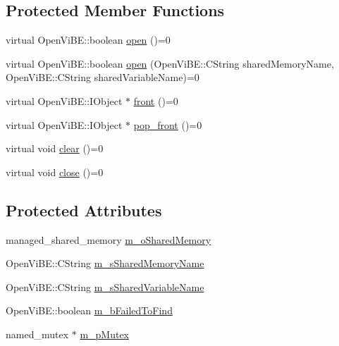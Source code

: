 \subsection*{Protected Member Functions}
\begin{DoxyCompactItemize}
\item 
virtual OpenViBE::boolean \hyperlink{classOpenViBEApplications_1_1ISharedMemoryReader_a5e153bb02320c3ea25beffd4df7b223c}{open} ()=0
\item 
virtual OpenViBE::boolean \hyperlink{classOpenViBEApplications_1_1ISharedMemoryReader_ad53797d01fdd6f79a2727ff6e3d39da2}{open} (OpenViBE::CString sharedMemoryName, OpenViBE::CString sharedVariableName)=0
\item 
virtual OpenViBE::IObject $\ast$ \hyperlink{classOpenViBEApplications_1_1ISharedMemoryReader_aae4da7ee678736f748f0f7e523fefbc7}{front} ()=0
\item 
virtual OpenViBE::IObject $\ast$ \hyperlink{classOpenViBEApplications_1_1ISharedMemoryReader_a558490f2ac7932c90e96ba25798f1800}{pop\_\-front} ()=0
\item 
virtual void \hyperlink{classOpenViBEApplications_1_1ISharedMemoryReader_a14f316c50e394eb81816c0e781284d63}{clear} ()=0
\item 
virtual void \hyperlink{classOpenViBEApplications_1_1ISharedMemoryReader_af453497d26a266316d5f087981212a97}{close} ()=0
\end{DoxyCompactItemize}
\subsection*{Protected Attributes}
\begin{DoxyCompactItemize}
\item 
managed\_\-shared\_\-memory \hyperlink{classOpenViBEApplications_1_1ISharedMemoryReader_a04ab97091f1197fada7cd30085526c7b}{m\_\-oSharedMemory}
\item 
OpenViBE::CString \hyperlink{classOpenViBEApplications_1_1ISharedMemoryReader_ac3dc5e78dd9876ee0565946aeaa3c4bd}{m\_\-sSharedMemoryName}
\item 
OpenViBE::CString \hyperlink{classOpenViBEApplications_1_1ISharedMemoryReader_ad6501b984c01074cc256480b64d6c75b}{m\_\-sSharedVariableName}
\item 
OpenViBE::boolean \hyperlink{classOpenViBEApplications_1_1ISharedMemoryReader_a917017622cf252bc27769d3284035613}{m\_\-bFailedToFind}
\item 
named\_\-mutex $\ast$ \hyperlink{classOpenViBEApplications_1_1ISharedMemoryReader_acb7b53ef01ff8121494d7b6ddeccab82}{m\_\-pMutex}
\end{DoxyCompactItemize}
